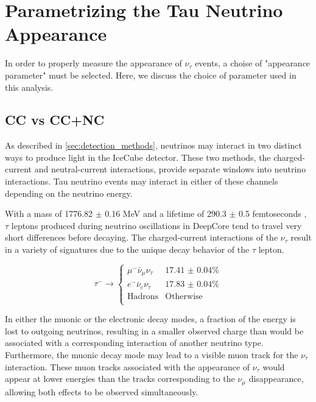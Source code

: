 \section{Parametrizing the Tau Neutrino Appearance}
In order to properly measure the appearance of $\nu_\tau$ events, a choise of "appearance parameter" must be selected.
Here, we discuss the choice of parameter used in this analysis.

\label{subsec:cc_vs_ccnc}
\subsection{CC vs CC+NC}
As described in \ref{sec:detection_methods}, neutrinos may interact in two distinct ways to produce light in the IceCube detector.
These two methods, the charged-current and neutral-current interactions, provide separate windows into neutrino interactions.
Tau neutrino events may interact in either of these channels depending on the neutrino energy.

With a mass of 1776.82 $\pm$ 0.16 MeV and a lifetime of 290.3 $\pm$ 0.5 femtoseconds , $\tau$ leptons produced during neutrino oscillations in DeepCore tend to travel very short differences before decaying.
The charged-current interactions of the $\nu_\tau$ result in a variety of signatures due to the unique decay behavior of the $\tau$ lepton.

\label{eqn:tau_decay_modes}
\begin{equation}
	\tau^- \rightarrow 
		\begin{cases} 
			\mu^- \bar{\nu}_\mu \nu_\tau & \mbox{17.41 $\pm$ 0.04\%} \\ 
			e^- \bar{\nu}_e \nu_\tau & \mbox{17.83 $\pm$ 0.04\%} \\ 
			\mbox{Hadrons} & \mbox{Otherwise} \\ 
		\end{cases}
\end{equation}

In either the muonic or the electronic decay modes, a fraction of the energy is lost to outgoing neutrinos, resulting in a smaller observed charge than would be associated with a corresponding interaction of another neutrino type.
Furthermore, the muonic decay mode may lead to a visible muon track for the $\nu_\tau$ interaction.
These muon tracks associated with the appearance of $\nu_\tau$ would appear at lower energies than the tracks corresponding to the $\nu_\mu$ disappearance, allowing both effects to be observed simultaneously.


